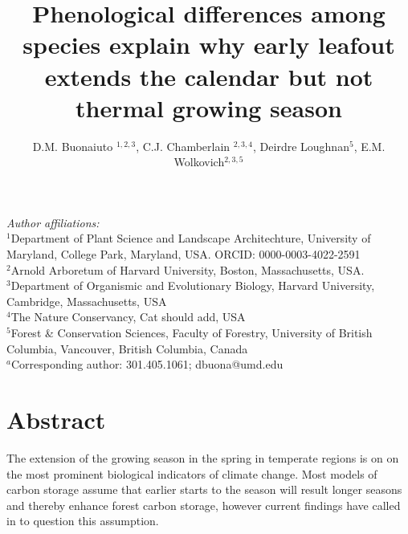 \documentclass{article}[12pt]
\title{Phenological differences among species explain why early leafout extends the calendar but not thermal growing season}
\author{D.M. Buonaiuto $^{1,2,3}$, C.J. Chamberlain $^{2,3,4}$,
Deirdre Loughnan$^{5}$, E.M. Wolkovich$^{2,3,5}$}
\begin{document}



\maketitle

\noindent \emph{Author affiliations:}\\
\noindent $^1$Department of Plant Science and Landscape Architechture, University of Maryland, College Park, Maryland, USA. ORCID: 0000-0003-4022-2591\\
\noindent $^2$Arnold Arboretum of Harvard University, Boston, Massachusetts, USA.\\
$^3$Department of Organismic and Evolutionary Biology, Harvard University, Cambridge, Massachusetts, USA \\
$^4$The Nature Conservancy, Cat should add, USA \\
$^5$Forest \& Conservation Sciences, Faculty of Forestry, University of British Columbia, Vancouver, British Columbia, Canada\\
$^a$Corresponding author: 301.405.1061; dbuona@umd.edu\\


\setlength{\parindent}{0pt}




\section{Abstract}
The extension of the growing season in the spring in temperate regions is on on the most prominent biological indicators of climate change. Most models of carbon storage assume that earlier starts to the season will result longer seasons and thereby enhance forest carbon storage, however current findings have called in to question this assumption.
\end{document}
